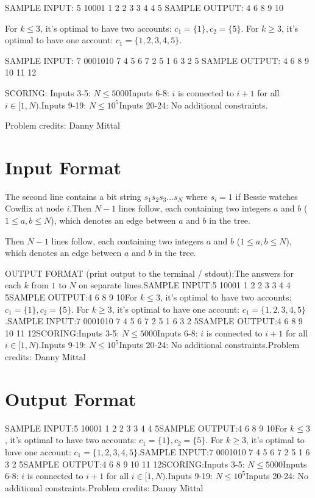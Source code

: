 \documentclass[12pt]{article}
\begin{document}
SAMPLE INPUT:
5
10001
1 2
2 3
3 4
4 5
SAMPLE OUTPUT: 
4
6
8
9
10

For $k\le 3$, it's optimal to have two accounts: $c_1 = \{1\}, c_2 = \{5\}$. For
$k\ge 3$, it's optimal to have one account: $c_1 = \{1, 2, 3, 4, 5\}$.

SAMPLE INPUT:
7
0001010
7 4
5 6
7 2
5 1
6 3
2 5
SAMPLE OUTPUT: 
4
6
8
9
10
11
12

SCORING:
Inputs 3-5: $N\le 5000$Inputs 6-8: $i$ is connected to $i+1$ for all $i\in [1,N)$.Inputs 9-19: $N\le 10^5$Inputs 20-24: No additional constraints.


Problem credits: Danny Mittal



\section*{Input Format}
The second line contains a bit string $s_1s_2s_3 \dots s_N$ where $s_i = 1$ if
Bessie watches Cowflix at node $i$.Then $N-1$ lines follow, each containing two integers $a$ and $b$
($1 \leq a, b \leq N$), which denotes an edge between $a$ and $b$ in the tree.

Then $N-1$ lines follow, each containing two integers $a$ and $b$
($1 \leq a, b \leq N$), which denotes an edge between $a$ and $b$ in the tree.

OUTPUT FORMAT (print output to the terminal / stdout):The answers for each $k$ from $1$ to $N$ on separate lines.SAMPLE INPUT:5
10001
1 2
2 3
3 4
4 5SAMPLE OUTPUT:4
6
8
9
10For $k\le 3$, it's optimal to have two accounts: $c_1 = \{1\}, c_2 = \{5\}$. For
$k\ge 3$, it's optimal to have one account: $c_1 = \{1, 2, 3, 4, 5\}$.SAMPLE INPUT:7
0001010
7 4
5 6
7 2
5 1
6 3
2 5SAMPLE OUTPUT:4
6
8
9
10
11
12SCORING:Inputs 3-5: $N\le 5000$Inputs 6-8: $i$ is connected to $i+1$ for all $i\in [1,N)$.Inputs 9-19: $N\le 10^5$Inputs 20-24: No additional constraints.Problem credits: Danny Mittal

\section*{Output Format}
SAMPLE INPUT:5
10001
1 2
2 3
3 4
4 5SAMPLE OUTPUT:4
6
8
9
10For $k\le 3$, it's optimal to have two accounts: $c_1 = \{1\}, c_2 = \{5\}$. For
$k\ge 3$, it's optimal to have one account: $c_1 = \{1, 2, 3, 4, 5\}$.SAMPLE INPUT:7
0001010
7 4
5 6
7 2
5 1
6 3
2 5SAMPLE OUTPUT:4
6
8
9
10
11
12SCORING:Inputs 3-5: $N\le 5000$Inputs 6-8: $i$ is connected to $i+1$ for all $i\in [1,N)$.Inputs 9-19: $N\le 10^5$Inputs 20-24: No additional constraints.Problem credits: Danny Mittal
\end{document}
